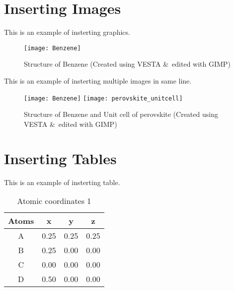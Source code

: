 \section{Inserting Images}

This is an example of insterting graphics.

\begin{figure}[H]
	\centering
	\texttt{[image: Benzene]}
	\caption[CH structure]{Structure of Benzene (Created using
	VESTA \&\ edited with GIMP)}
	\label{fig:benzene}
\end{figure}

This is an example of insterting multiple images in same line.

\begin{figure}[H]
	\centering
	\texttt{[image: Benzene]}
	\hspace{0.5cm}
	\texttt{[image: perovskite\_unitcell]}
	\caption[CH \&\ ABO structure]{Structure of Benzene
	and Unit cell of perovskite (Created using VESTA \&\ edited with GIMP)}
\end{figure}

\section{Inserting Tables}

This is an example of insterting table.

\begin{table}[H] %
	\centering
\begin{tabular}{|c|c|c|c|}
	\hline %
	Atoms & x & y & z\\ %
	\hline
	A & 0.25 & 0.25 & 0.25\\
	B & 0.25 & 0.00 & 0.00\\
	C & 0.00 & 0.00 & 0.00\\
	D & 0.50 & 0.00 & 0.00\\
	\hline
\end{tabular}
	\caption[Atomic coordinates 1]{Atomic coordinates 1}
	\label{tab:atom}
\end{table}

